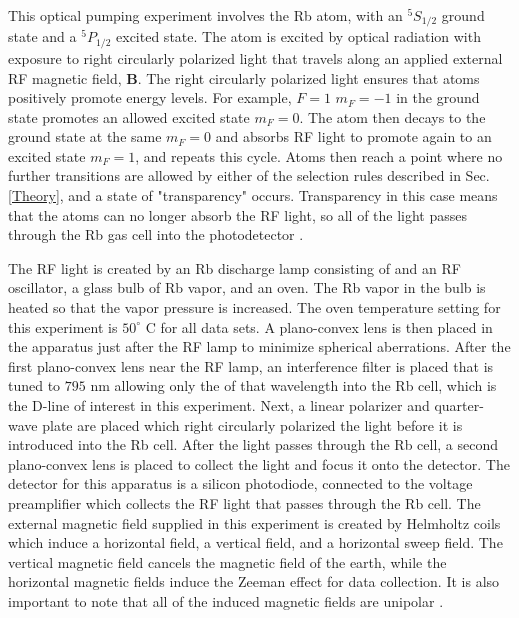 \documentclass[
 reprint,
linenumbers,
aps,amsmath
]{revtex4-2}
\begin{document}
This optical pumping experiment involves the Rb atom, with an $^5S_{1/2}$ ground state and a $^5P_{1/2}$ excited state. The atom is excited by optical radiation with exposure to right circularly polarized light that travels along an applied external RF magnetic field, $\mathbf{B}$. The right circularly polarized light ensures that atoms positively promote energy levels. For example, $F=1$ $m_F=-1$ in the ground state promotes an allowed excited state $m_F=0$. The atom then decays to the ground state at the same $m_F=0$ and absorbs RF light to promote again to an excited state $m_F=1$, and repeats this cycle. Atoms then reach a point where no further transitions are allowed by either of the selection rules described in Sec. \ref{Theory}, and a state of "transparency" occurs. Transparency in this case means that the atoms can no longer absorb the RF light, so all of the light passes through the Rb gas cell into the photodetector \cite{Optical_Pumping_Happer}.

The RF light is created by an Rb discharge lamp consisting of and an RF oscillator, a glass bulb of Rb vapor, and an oven. The Rb vapor in the bulb is heated so that the vapor pressure is increased. The oven temperature setting for this experiment is $50^\circ$ C for all data sets. A plano-convex lens is then placed in the apparatus just after the RF lamp to minimize spherical aberrations. After the first plano-convex lens near the RF lamp, an interference filter is placed that is tuned to $795$ nm allowing only the of that wavelength into the Rb cell, which is the D-line of interest in this experiment. Next, a linear polarizer and quarter-wave plate are placed which right circularly polarized the light before it is introduced into the Rb cell. After the light passes through the Rb cell, a second plano-convex lens is placed to collect the light and focus it onto the detector. The detector for this apparatus is a silicon photodiode, connected to the voltage preamplifier which collects the RF light that passes through the Rb cell. The external magnetic field supplied in this experiment is created by Helmholtz coils which induce a horizontal field, a vertical field, and a horizontal sweep field. The vertical magnetic field cancels the magnetic field of the earth, while the horizontal magnetic fields induce the Zeeman effect for data collection. It is also important to note that all of the induced magnetic fields are unipolar \cite{Optical_Pumping_Happer}.
\end{document}
